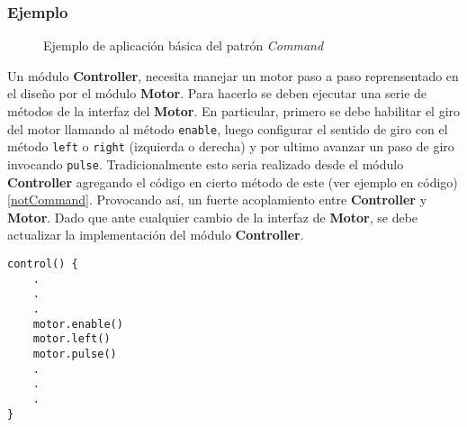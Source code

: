 \subsubsection{Ejemplo}

\begin{figure}[H]
\caption{Ejemplo de aplicación básica del patrón \textit{Command}}
\begin{center}
\end{center}
\end{figure}
Un módulo \textbf{Controller}, necesita manejar un motor paso a paso reprensentado en el diseño por el módulo \textbf{Motor}. Para hacerlo se deben ejecutar una serie de métodos de la interfaz del \textbf{Motor}. En particular, primero se debe habilitar el giro del motor llamando al método \verb|enable|, luego configurar el sentido de giro con el método \verb|left| o \verb|right| (izquierda o derecha) y por ultimo avanzar un paso de giro invocando \verb|pulse|. Tradicionalmente esto seria realizado desde el módulo \textbf{Controller} agregando el código en cierto método de este (ver ejemplo en código) \ref{notCommand}. Provocando así, un fuerte acoplamiento entre \textbf{Controller} y \textbf{Motor}. Dado que ante cualquier cambio de la interfaz de \textbf{Motor}, se debe actualizar la implementación del módulo \textbf{Controller}.


\begin{lstlisting}[label={notCommand}, caption=Ejemplo de implementación sin usar el patrón \textit{Command}.]
control() {
    .
    .
    .
    motor.enable()
    motor.left()
    motor.pulse()
    .
    .
    .  
}
\end{lstlisting}

